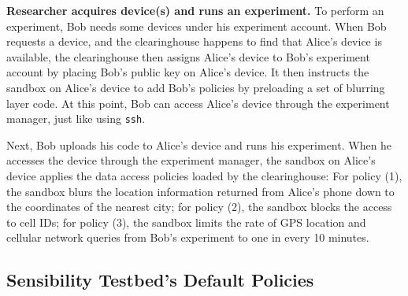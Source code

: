 \textbf{Researcher acquires device(s) and runs an experiment.}
To perform an experiment, Bob needs some devices under his 
experiment account. 
%
When Bob requests a device, and the clearinghouse
happens to find that Alice's device is available, the clearinghouse then 
assigns Alice's device to Bob's experiment account by placing Bob's
public key on Alice's device. It then instructs 
the sandbox on Alice's device to add Bob's policies by preloading
a set of blurring layer code. At this point, Bob can access Alice's 
device through the experiment manager, just like using \texttt{ssh}.

Next, Bob uploads his code to Alice's device and 
runs his experiment. When he accesses the device through
the experiment manager, the sandbox on Alice's device 
applies the data access policies loaded by the clearinghouse: For 
policy (1), the sandbox blurs the location
information returned from Alice's phone down to the coordinates
of the nearest city; for policy (2), the sandbox blocks the
access to cell IDs; for policy (3), the sandbox limits the rate
of GPS location and cellular network queries from Bob's
experiment to one in every 10 minutes.

\subsection{Sensibility Testbed's Default Policies}\label{sec-irb-policies}

%
%

